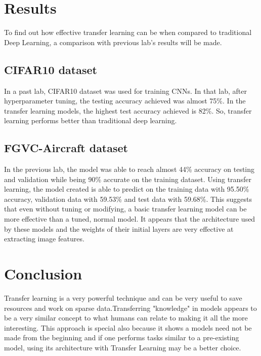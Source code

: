 \documentclass[conference,compsoc]{IEEEtran}
\begin{document}
\section{Results}
To find out how effective transfer learning can be when compared to traditional Deep Learning, a comparison with previous lab's results will be made.
\subsection{CIFAR10 dataset}
In a past lab, CIFAR10 dataset was used for training CNNs. In that lab, after hyperparameter tuning, the testing accuracy achieved was almost 75\%. In the  transfer learning models, the highest test accuracy achieved is 82\%. So, transfer learning performs better than traditional deep learning.

\subsection{FGVC-Aircraft dataset}
In the previous lab, the model was able to reach almost 44\% accuracy on testing and validation while being 90\% accurate on the training dataset. Using transfer learning, the model created is able to predict on the training data with 95.50\% accuracy, validation data with 59.53\% and test data with 59.68\%. This suggests that even without tuning or modifying, a basic transfer learning model can be more effective than a tuned, normal model. It appears that the architecture used by these models and the weights of their initial layers are very effective at extracting image features.

\section{Conclusion}
Transfer learning is a very powerful technique and can be very useful to save resources and work on sparse data.Transferring "knowledge" in models appears to be a very similar concept to what humans can relate to making it all the more interesting. This approach is special also because it shows a models need not be made from the beginning and if one performs tasks similar to a pre-existing model, using its architecture with Transfer Learning may be a better choice.
\end{document}
